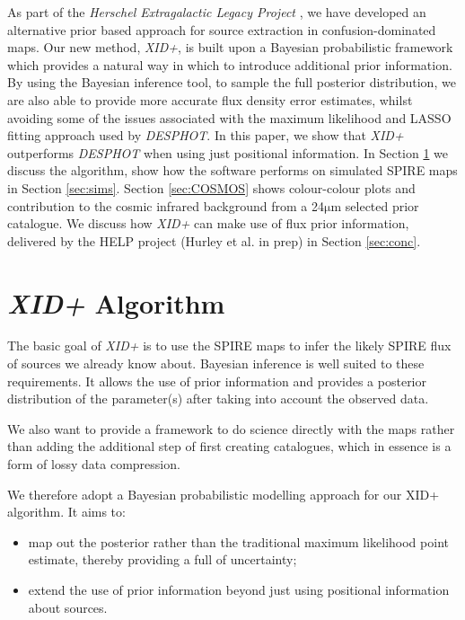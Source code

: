 \documentclass[useAMS,usenatbib]{mnras}
\begin{document}
As part of the \emph{Herschel Extragalactic Legacy Project} \citep[HELP;][]{Oliver:2016}, we have developed an alternative prior based approach for source extraction in confusion-dominated maps. Our new method, \emph{XID+}, is built upon a Bayesian probabilistic framework which provides a natural way in which to introduce additional prior information. By using the Bayesian inference tool, \citep[\emph{Stan}][]{pystan-software:2015, stan-software:2015} to sample the full posterior distribution, we are also able to provide more accurate flux density error estimates, whilst avoiding some of the issues associated with the maximum likelihood and LASSO fitting approach used by \emph{DESPHOT}. In this paper, we show that \emph{XID+} outperforms \emph{DESPHOT} when using just positional information. In Section \ref{sec:XID+} we discuss the algorithm, show how the software performs on simulated SPIRE maps in Section \ref{sec:sims}. Section \ref{sec:COSMOS} shows colour-colour plots and contribution to the cosmic infrared background from a 24$\mathrm{\mu m}$ selected prior catalogue. We discuss how \emph{XID+} can make use of flux prior information, delivered by the HELP project (Hurley et al. in prep) in Section \ref{sec:conc}.
 
\section{\emph{XID+} Algorithm}\label{sec:XID+}
The basic goal of \emph{XID+} is to use the SPIRE maps to infer the likely SPIRE flux of sources we already know about. Bayesian inference is well suited to these requirements. It allows the use of prior information and provides a posterior distribution of the parameter(s) after taking into account the observed data.  

We also want to provide a framework to do science directly with the maps rather than adding the additional step of first creating catalogues, which in essence is a form of lossy data compression.

We therefore adopt a Bayesian probabilistic modelling approach for our XID+ algorithm. It aims to:
\begin{itemize}
\item map out the posterior rather than the traditional maximum likelihood point estimate, thereby providing a full of uncertainty; 
\item extend the use of prior information beyond just using positional information about sources.
\end{itemize}
\end{document}
